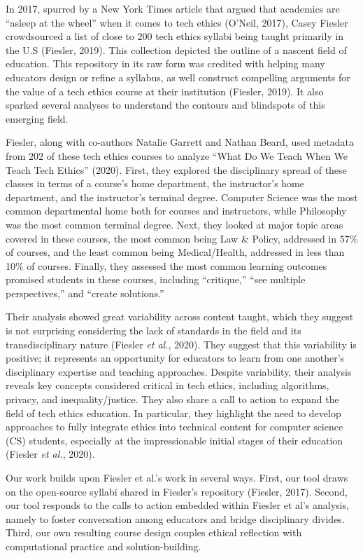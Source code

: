 \documentclass[
]{article}
\begin{document}
In 2017, spurred by a New York Times article that argued that academics
are ``asleep at the wheel'' when it comes to tech ethics (O'Neil, 2017),
Casey Fiesler crowdsourced a list of close to 200 tech ethics syllabi
being taught primarily in the U.S (Fiesler, 2019). This collection
depicted the outline of a nascent field of education. This repository in
its raw form was credited with helping many educators design or refine a
syllabus, as well construct compelling arguments for the value of a tech
ethics course at their institution (Fiesler, 2019). It also sparked
several analyses to understand the contours and blindspots of this
emerging field.

Fiesler, along with co-authors Natalie Garrett and Nathan Beard, used
metadata from 202 of these tech ethics courses to analyze ``What Do We
Teach When We Teach Tech Ethics'' (2020). First, they explored the
disciplinary spread of these classes in terms of a course's home
department, the instructor's home department, and the instructor's
terminal degree. Computer Science was the most common departmental home
both for courses and instructors, while Philosophy was the most common
terminal degree. Next, they looked at major topic areas covered in these
courses, the most common being Law \& Policy, addressed in 57\% of
courses, and the least common being Medical/Health, addressed in less
than 10\% of courses. Finally, they assessed the most common learning
outcomes promised students in these courses, including ``critique,''
``see multiple perspectives,'' and ``create solutions.''

Their analysis showed great variability across content taught, which
they suggest is not surprising considering the lack of standards in the
field and its transdisciplinary nature (Fiesler \emph{et al.}, 2020).
They suggest that this variability is positive; it represents an
opportunity for educators to learn from one another's disciplinary
expertise and teaching approaches. Despite variability, their analysis
reveals key concepts considered critical in tech ethics, including
algorithms, privacy, and inequality/justice. They also share a call to
action to expand the field of tech ethics education. In particular, they
highlight the need to develop approaches to fully integrate ethics into
technical content for computer science (CS) students, especially at the
impressionable initial stages of their education (Fiesler \emph{et al.},
2020).

Our work builds upon Fiesler et al.'s work in several ways. First, our
tool draws on the open-source syllabi shared in Fiesler's repository
(Fiesler, 2017). Second, our tool responds to the calls to action
embedded within Fiesler et al's analysis, namely to foster conversation
among educators and bridge disciplinary divides. Third, our own
resulting course design couples ethical reflection with computational
practice and solution-building.
\end{document}
